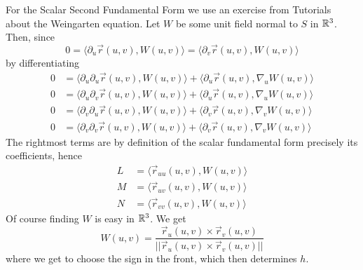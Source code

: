 \documentclass[a4paper, 12pt]{article}
\begin{document}
\begin{Exercise}
\begin{enumerate}[label=(\roman*)]
            For the Scalar Second Fundamental Form we use an exercise from Tutorials about the Weingarten equation.
            Let $W$ be some unit field normal to $S$ in $\mathbb{R}^3$.
            Then, since
            \[
                0
                = \langle \partial_u\vec{r}(u, v), W(u, v) \rangle
                = \langle \partial_v\vec{r}(u, v), W(u, v) \rangle
            \]
            by differentiating
            \begin{align*}
                0 &= \langle \partial_u\partial_u\vec{r}(u, v), W(u, v)\rangle + \langle \partial_u\vec{r}(u, v), \nabla_u W(u, v) \rangle \\
                0 &= \langle \partial_u\partial_v\vec{r}(u, v), W(u, v)\rangle + \langle \partial_u\vec{r}(u, v), \nabla_u W(u, v) \rangle \\
                0 &= \langle \partial_v\partial_u\vec{r}(u, v), W(u, v)\rangle + \langle \partial_v\vec{r}(u, v), \nabla_v W(u, v) \rangle \\
                0 &= \langle \partial_v\partial_v\vec{r}(u, v), W(u, v)\rangle + \langle \partial_v\vec{r}(u, v), \nabla_v W(u, v) \rangle
            \end{align*}
            The rightmost terms are by definition of the scalar fundamental form precisely its coefficients,
            hence
            \begin{align*}
                L &= \langle \vec{r}_{uu}(u, v), W(u, v)\rangle \\
                M &= \langle \vec{r}_{uv}(u, v), W(u, v)\rangle \\
                N &= \langle \vec{r}_{vv}(u, v), W(u, v)\rangle
            \end{align*}
            Of course finding $W$ is easy in $\mathbb{R}^3$.
            We get
            \[
                W(u, v) = \frac{\vec{r}_u (u, v) \times \vec{r}_v (u, v)}{||\vec{r}_u (u, v) \times \vec{r}_v (u, v)||}
            \]
            where we get to choose the sign in the front, which then determines $h$.


\end{enumerate}
\end{Exercise}
\end{document}
